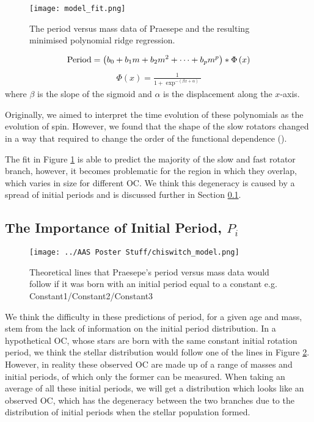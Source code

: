 \documentclass[fleqn,usenatbib]{mnras}
\begin{document}
{\begin{figure}
	\texttt{[image: model\_fit.png]}
	\caption{The period versus mass data of Praesepe and the resulting minimised polynomial ridge regression.}
	\label{fig:model_fit}
\end{figure}
\begin{align}
	\label{eq:poly+sigmoid}
	\textup{Period} = \left(b_0 + b_1m + b_2m^2+\dots+b_pm^p\right)*\Phi\left(x\right)
\end{align}
\begin{align}
	\label{eq:sigmoid}
	\Phi\left(x\right) = \frac{1}{1 + \exp^{-(\beta x + \alpha)}}
\end{align}
where $\beta$ is the slope of the sigmoid and $\alpha$ is the displacement along the $x$-axis.

Originally, we aimed to interpret the time evolution of these polynomials as the evolution of spin.
However, we found that the shape of the slow rotators changed in a way that required to change the order of the functional dependence (\cite{2019ApJ...879...49C}).

The fit in Figure \ref{fig:model_fit} is able to predict the majority of the slow and fast rotator branch, however, it becomes problematic for the region in which they overlap, which varies in size for different OC.
We think this degeneracy is caused by a spread of initial periods and is discussed further in Section \ref{sec:initial_period}.

\subsection{The Importance of Initial Period, $P_i$} \label{sec:initial_period}
\begin{figure}
	\texttt{[image: ../AAS Poster Stuff/chiswitch\_model.png]}
	\caption{Theoretical lines that Praesepe's period versus mass data would follow if it was born with an initial period equal to a constant e.g. Constant1/Constant2/Constant3}
	\label{fig:spread_initial_period}
\end{figure}
We think the difficulty in these predictions of period, for a given age and mass, stem from the lack of information on the initial period distribution.
In a hypothetical OC, whose stars are born with the same constant initial rotation period, we think the stellar distribution would follow one of the lines in Figure \ref{fig:spread_initial_period}.
However, in reality these observed OC are made up of a range of masses and initial periods, of which only the former can be measured.
When taking an average of all these initial periods, we will get a distribution which looks like an observed OC, which has the degeneracy between the two branches due to the distribution of initial periods when the stellar population formed.

}
\end{document}
